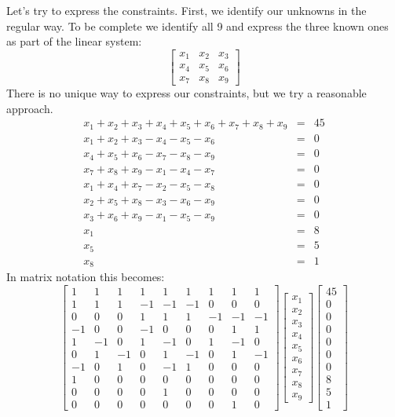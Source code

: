 \documentclass[11pt]{article}
\begin{document}
Let's try to express the constraints. First, we identify our unknowns
in the regular way. To be complete we identify all 9 and express the
three known ones as part of the linear system:
\[
\begin{bmatrix}
x_1 & x_2 & x_3 \\
x_4 & x_5 & x_6 \\
x_7 & x_8 & x_9
\end{bmatrix}
\]
There is no unique way to express our constraints, but we try a reasonable approach. 
\begin{eqnarray*}
x_1 + x_2 + x_3 + x_4 + x_5 + x_6 + x_7 + x_8 + x_9 &=& 45 \\
x_1 + x_2 + x_3 - x_4 - x_5 - x_6 &=& 0 \\
x_4 + x_5 + x_6 - x_7 - x_8 - x_9 &=& 0 \\
x_7 + x_8 + x_9 - x_1 -x_4 - x_7 &=& 0  \\
x_1 + x_4 + x_7 - x_2 - x_5 - x_8 &=& 0 \\
x_2 + x_5 + x_8 - x_3 - x_6 - x_9 &=& 0 \\
x_3 + x_6 + x_9 - x_1 -x_5 - x_9 &=& 0  \\
x_1 &=& 8 \\
x_5 &=& 5  \\
x_8 &=& 1 
\end{eqnarray*}
In matrix notation this becomes:
$$\left[
\begin{array}{rrrrrrrrr}
1 & 1 & 1 & 1 & 1 & 1 & 1 & 1 & 1 \\
1 & 1 & 1 & -1 & -1 & -1 & 0 & 0 & 0 \\
0 & 0 & 0 & 1 & 1 & 1 & -1 & -1 & -1 \\
-1 & 0 & 0 & -1 & 0 & 0  & 0 & 1 & 1 \\
1 & -1 & 0 & 1 & -1 & 0 & 1 & -1 & 0 \\
0 & 1 & -1 & 0 & 1 & -1 & 0 & 1 & -1 \\
-1 & 0 & 1 & 0 & -1 & 1 & 0 & 0 & 0 \\
1 & 0 & 0 & 0 & 0 & 0 & 0 & 0 & 0 \\
0 & 0 & 0 & 0 & 1 & 0 & 0 & 0 & 0 \\
0 & 0 & 0 & 0 & 0 & 0 & 0 & 1 & 0
\end{array}
\right]
\left[
\begin{array}{r} x_1 \\ x_2 \\ x_3 \\ x_4 \\ x_5 \\ x_6 \\ x_7 \\ x_8 \\ x_9 
\end{array}
\right]
\left[
\begin{array}{r} 45 \\ 0 \\ 0 \\ 0 \\ 0 \\ 0 \\ 0 \\ 8 \\ 5 \\ 1
\end{array}
\right]
$$
\end{document}
